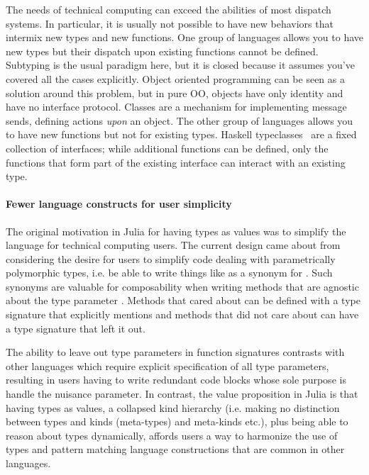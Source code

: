 The needs of technical computing can exceed the abilities of most dispatch systems. In particular, it is usually not possible to have new behaviors that intermix new types and new functions. One group of languages allows you to have new types but their dispatch upon existing functions cannot be defined. Subtyping is the usual paradigm here, but it is closed because it assumes you've covered all the cases explicitly. Object oriented programming can be seen as a solution around this problem, but in pure OO, objects have only identity and have no interface protocol. Classes are a mechanism for implementing message sends, defining actions \textit{upon} an object. The other group of languages allows you to have new functions but not for existing types. Haskell typeclasses~\cite{typeclass} are a fixed collection of interfaces; while additional functions can be defined, only the functions that form part of the existing interface can interact with an existing type.

\paragraph{Fewer language constructs for user simplicity}

The original motivation in Julia for having types as values was to simplify the
language for technical computing users. The current design came about from
considering the desire for users to simplify code dealing with parametrically
polymorphic types, i.e. be able to write things like  as a synonym
for . Such synonyms are valuable for composability when writing 
methods that are agnostic about the type parameter . Methods that cared
about  can be defined with a type signature that explicitly mentions
 and methods that did not care about  can have a type signature
that left it out.

The ability to leave out type parameters in function signatures contrasts with
other languages which require explicit specification of all type parameters,
resulting in users having to write redundant code blocks whose sole purpose is
handle the nuisance parameter. In contrast, the value proposition in Julia is
that having types as values, a collapsed kind hierarchy (i.e. making no
distinction between types and kinds (meta-types) and meta-kinds etc.), plus
being able to reason about types dynamically, affords users a way to harmonize
the use of types and pattern matching language constructions that are common in
other languages.

